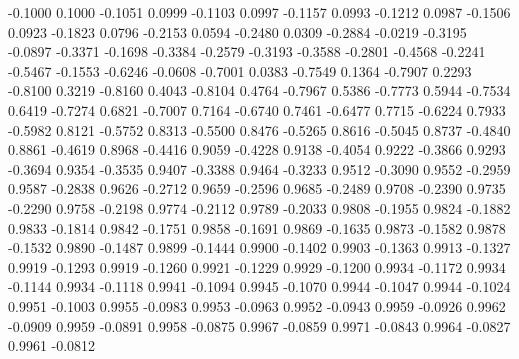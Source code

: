    -0.1000    0.1000
   -0.1051    0.0999
   -0.1103    0.0997
   -0.1157    0.0993
   -0.1212    0.0987
   -0.1506    0.0923
   -0.1823    0.0796
   -0.2153    0.0594
   -0.2480    0.0309
   -0.2884   -0.0219
   -0.3195   -0.0897
   -0.3371   -0.1698
   -0.3384   -0.2579
   -0.3193   -0.3588
   -0.2801   -0.4568
   -0.2241   -0.5467
   -0.1553   -0.6246
   -0.0608   -0.7001
    0.0383   -0.7549
    0.1364   -0.7907
    0.2293   -0.8100
    0.3219   -0.8160
    0.4043   -0.8104
    0.4764   -0.7967
    0.5386   -0.7773
    0.5944   -0.7534
    0.6419   -0.7274
    0.6821   -0.7007
    0.7164   -0.6740
    0.7461   -0.6477
    0.7715   -0.6224
    0.7933   -0.5982
    0.8121   -0.5752
    0.8313   -0.5500
    0.8476   -0.5265
    0.8616   -0.5045
    0.8737   -0.4840
    0.8861   -0.4619
    0.8968   -0.4416
    0.9059   -0.4228
    0.9138   -0.4054
    0.9222   -0.3866
    0.9293   -0.3694
    0.9354   -0.3535
    0.9407   -0.3388
    0.9464   -0.3233
    0.9512   -0.3090
    0.9552   -0.2959
    0.9587   -0.2838
    0.9626   -0.2712
    0.9659   -0.2596
    0.9685   -0.2489
    0.9708   -0.2390
    0.9735   -0.2290
    0.9758   -0.2198
    0.9774   -0.2112
    0.9789   -0.2033
    0.9808   -0.1955
    0.9824   -0.1882
    0.9833   -0.1814
    0.9842   -0.1751
    0.9858   -0.1691
    0.9869   -0.1635
    0.9873   -0.1582
    0.9878   -0.1532
    0.9890   -0.1487
    0.9899   -0.1444
    0.9900   -0.1402
    0.9903   -0.1363
    0.9913   -0.1327
    0.9919   -0.1293
    0.9919   -0.1260
    0.9921   -0.1229
    0.9929   -0.1200
    0.9934   -0.1172
    0.9934   -0.1144
    0.9934   -0.1118
    0.9941   -0.1094
    0.9945   -0.1070
    0.9944   -0.1047
    0.9944   -0.1024
    0.9951   -0.1003
    0.9955   -0.0983
    0.9953   -0.0963
    0.9952   -0.0943
    0.9959   -0.0926
    0.9962   -0.0909
    0.9959   -0.0891
    0.9958   -0.0875
    0.9967   -0.0859
    0.9971   -0.0843
    0.9964   -0.0827
    0.9961   -0.0812